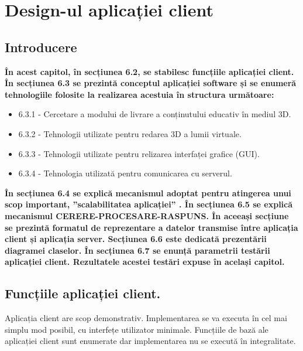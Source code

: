 \chapter{Design-ul aplicației client}
\section{Introducere}
\par \textbf{În acest capitol, în secțiunea 6.2, se stabilesc funcțiile aplicației client. În secțiunea 6.3 se prezintă conceptul aplicației software și se enumeră tehnologiile folosite la realizarea acestuia în structura următoare: }

\begin{itemize}
\item 6.3.1 - Cercetare a modului de livrare a conținutului educativ în mediul 3D.
\item 6.3.2 - Tehnologii utilizate pentru redarea 3D a lumii virtuale.
\item 6.3.3 - Tehnologii utilizate pentru relizarea interfaței grafice (GUI).
\item 6.3.4 - Tehnologia utilizată pentru comunicarea cu serverul.
\end{itemize}

\par \textbf{ În secțiunea 6.4 se explică mecanismul adoptat pentru atingerea unui scop important, ”scalabilitatea aplicației” . În secțiunea 6.5 se explică mecanismul CERERE-PROCESARE-RASPUNS. În aceeași secțiune se prezintă formatul de reprezentare a datelor transmise între aplicația client și aplicația server. Secțiunea 6.6 este dedicată prezentării diagramei claselor. În secțiunea 6.7 se enunță parametrii testării aplicației client. Rezultatele acestei testări expuse în același capitol. } 

\newpage

\section{Funcțiile aplicației client.}

\par Aplicația client are scop demonstrativ. Implementarea se va executa în cel mai simplu mod posibil, cu interfețe utilizator minimale. Funcțiile de bază ale aplicației client sunt enumerate dar implementarea nu se execută în integralitate.

